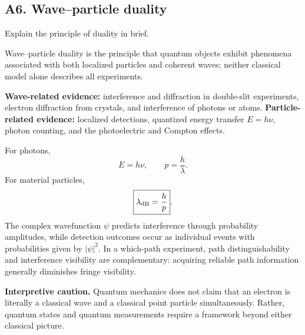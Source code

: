 \documentclass[11pt,a4paper]{article}
\begin{document}
\subsection{A6. Wave--particle duality}
\begin{questionbox}Explain the principle of duality in brief.\end{questionbox}
Wave--particle duality is the principle that quantum objects exhibit phenomena associated with both localized particles and coherent waves; neither classical model alone describes all experiments.\par
\textbf{Wave-related evidence:} interference and diffraction in double-slit experiments, electron diffraction from crystals, and interference of photons or atoms. \textbf{Particle-related evidence:} localized detections, quantized energy transfer $E=h\nu$, photon counting, and the photoelectric and Compton effects.\par
For photons,
\begin{equation}E=h\nu,\qquad p=\frac h\lambda.
\end{equation}
For material particles,
\begin{equation}\boxed{\lambda_{\rm dB}=\frac hp}.
\end{equation}
The complex wavefunction $\psi$ predicts interference through probability amplitudes, while detection outcomes occur as individual events with probabilities given by $|\psi|^2$. In a which-path experiment, path distinguishability and interference visibility are complementary: acquiring reliable path information generally diminishes fringe visibility.\par
\textbf{Interpretive caution.} Quantum mechanics does not claim that an electron is literally a classical wave and a classical point particle simultaneously. Rather, quantum states and quantum measurements require a framework beyond either classical picture.
\end{document}
